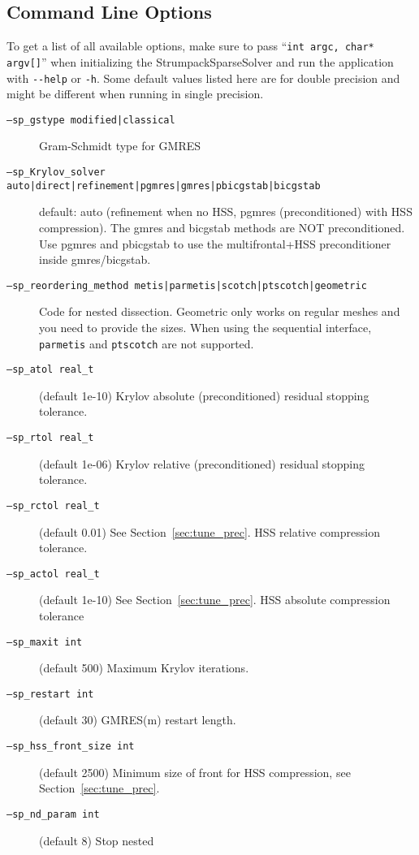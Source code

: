 \documentclass{article}
\begin{document}
\subsection{Command Line Options}
To get a list of all available options, make sure to pass
``\verb!int argc, char* argv[]!'' when initializing the
StrumpackSparseSolver and run the application with
\lstinline[style=Bash]!--help! or \lstinline[style=Bash]!-h!. Some
default values listed here are for double precision and might be
different when running in single precision.
\begin{description}
\item[\texttt{---sp\_gstype modified|classical}]
  Gram-Schmidt type for GMRES
\item[\texttt{---sp\_Krylov\_solver
    auto|direct|refinement|pgmres|gmres|pbicgstab|bicgstab}] default:
  auto (refinement when no HSS, pgmres (preconditioned) with HSS
  compression).  The gmres and bicgstab methods are NOT
  preconditioned. Use pgmres and pbicgstab to use the multifrontal+HSS
  preconditioner inside gmres/bicgstab.
\item[\texttt{---sp\_reordering\_method
    metis|parmetis|scotch|ptscotch|geometric}] Code for nested
  dissection. Geometric only works on regular meshes and you need to
  provide the sizes. When using the sequential interface,
  \lstinline[style=Bash]!parmetis!  and
  \lstinline[style=Bash]!ptscotch! are not supported.
\item[\texttt{---sp\_atol real\_t}] (default 1e-10)
  Krylov absolute (preconditioned) residual stopping tolerance.
\item[\texttt{---sp\_rtol real\_t}] (default 1e-06)
  Krylov relative (preconditioned) residual stopping tolerance.
\item[\texttt{---sp\_rctol real\_t}] (default 0.01) See
  Section~\ref{sec:tune_prec}.  HSS relative compression tolerance.
\item[\texttt{---sp\_actol real\_t}] (default 1e-10) See
  Section~\ref{sec:tune_prec}. HSS absolute compression tolerance
\item[\texttt{---sp\_maxit int}] (default 500)
  Maximum Krylov iterations.
\item[\texttt{---sp\_restart int}] (default 30)
  GMRES(m) restart length.
\item[\texttt{---sp\_hss\_front\_size int}] (default 2500) Minimum size
  of front for HSS compression, see Section~\ref{sec:tune_prec}.
\item[\texttt{---sp\_nd\_param int}] (default 8) Stop nested

\end{description}
\end{document}
